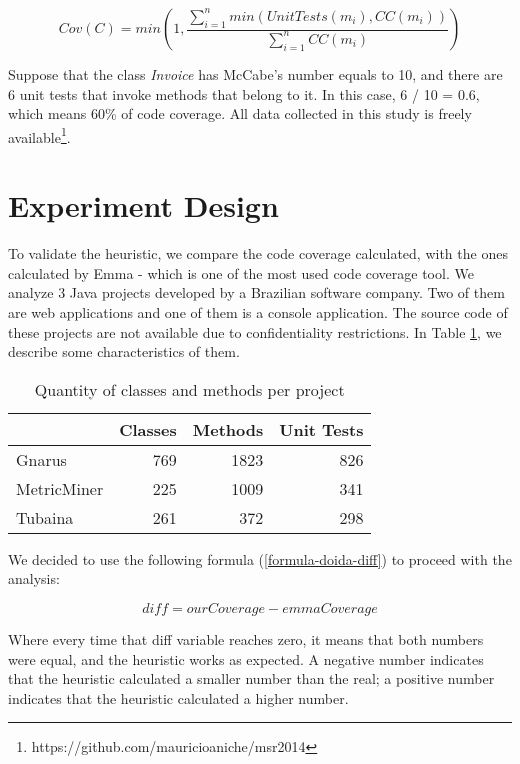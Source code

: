 \documentclass{sig-alternate}
\begin{document}
\begin{equation}
\label{formula-doida}
Cov(C) = min(1,\frac{\sum_{i=1}^{n}min(UnitTests(m_i), CC(m_i))}{\sum_{i=1}^{n}{CC(m_i)}})
\end{equation}

Suppose that the class \textit{Invoice} has McCabe's number equals to 10, 
and there are 6 unit tests that invoke methods that belong to it. 
In this case, 6 / 10 = 0.6, which means 60\% of code coverage.
All data collected in this study is freely available\footnote{https://github.com/mauricioaniche/msr2014}.

\section{Experiment Design}
\label{sec-experiment}

To validate the heuristic, we compare the code coverage calculated, with the ones 
calculated by Emma - which is one of the most used code coverage tool.
We
analyze 3 Java projects developed by a Brazilian software company. Two of them are
web applications and one of them is a console application. The source code of these projects are 
not available due to confidentiality restrictions.
In Table \ref{tab:projects}, we describe
some characteristics of them.

\begin{table}[h!]
\centering
\caption{Quantity of classes and methods per project}
\begin{tabular}{ | l | r | r | r | }
\hline
& Classes & Methods & Unit Tests\\ 
\hline
Gnarus & 769 & 1823 & 826\\ 
MetricMiner & 225 & 1009 & 341\\ 
Tubaina & 261 & 372 & 298\\ 

\hline
\end{tabular}
\label{tab:projects}
\end{table}

We decided to use the following formula (\ref{formula-doida-diff}) to proceed with the analysis:

\begin{equation}
\label{formula-doida-diff}
diff = ourCoverage - emmaCoverage
\end{equation}

Where every time that diff variable reaches zero, it means that both numbers
were equal, and the heuristic works as expected. A negative number indicates that the heuristic calculated
a smaller number than the real; a positive number indicates that the heuristic calculated a higher
number.
\end{document}
